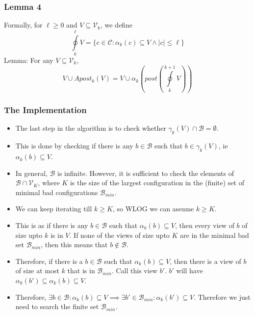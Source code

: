 \documentclass{beamer}
\begin{document}
{        \begin{frame}
            \frametitle{Lemma 4}
                Formally, for $\ell \geq 0$ and $V \subseteq \mathcal{V}_{k}$, we define 
                \begin{equation*}
                    \oint\limits_{k}^{\ell} V = \{c \in \mathcal{C} : \alpha_{k}(c) \subseteq V \wedge \left|c\right| \leq \ell\}
                \end{equation*}
                Lemma: For any $V \subseteq \mathcal{V}_{k}$,
                \begin{equation*}
                    V \cup Apost_{k}(V) = V \cup \alpha_{k}(post(\oint\limits_{k}^{k + 1}V))
                \end{equation*}
        \end{frame}


        \begin{frame}
            \frametitle{The Implementation}
            \begin{itemize}
                \item The last step in the algorithm is to check whether $\gamma_{k}(V) \cap \mathcal{B} = \emptyset$.
                \item This is done by checking if there is any $b \in \mathcal{B}$ such that $b \in \gamma_{k}(V)$, ie $\alpha_{k}(b) \subseteq V$.
                \item In general, $\mathcal{B}$ is infinite. However, it is sufficient to check the elements of $\mathcal{B} \cap \mathcal{V}_{K}$, where $K$ is the size of the largest configuration in the (finite) set of minimal bad configurations $\mathcal{B}_{min}$. 
                \item We can keep iterating till $k \geq K$, so WLOG we can assume $k \geq K$.
                \item This is as if there is any $b \in \mathcal{B}$ such that $\alpha_{k}(b) \subseteq V$, then every view of $b$ of size upto $k$ is in $V$. If none of the views of size upto $K$ are in the minimal bad set $\mathcal{B}_{min}$, then this means that $b \notin \mathcal{B}$. 
                \item Therefore, if there is a $b \in \mathcal{B}$ such that $\alpha_{k}(b) \subseteq V$, then there is a view of $b$ of size at most $k$ that is in $\mathcal{B}_{min}$. Call this view $b'$. $b'$ will have $\alpha_{k}(b') \subseteq \alpha_{k}(b) \subseteq V$.
                \item Therefore, $\exists b \in \mathcal{B}: \alpha_{k}(b) \subseteq V \implies \exists b' \in \mathcal{B}_{min}: \alpha_{k}(b') \subseteq V$. Therefore we just need to search the finite set $\mathcal{B}_{min}$.
            \end{itemize}
        \end{frame}

}
\end{document}
